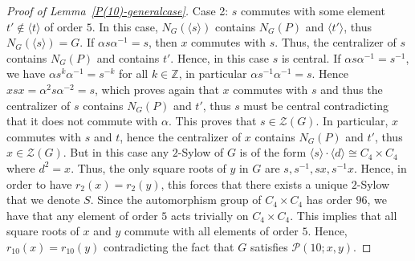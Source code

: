 \documentclass[12pt]{amsart}
\numberwithin{equation}{section}
\newcommand{\Z}{\mathbb Z}
\theoremstyle{definition}
\theoremstyle{remark}
\begin{document}
\begin{proof}[Proof of Lemma~\ref{P(10)-generalcase}]
    Case 2: $s$ commutes with some element $t'\notin \langle t\rangle$ of order $5$. In this case, $N_G(\langle s\rangle)$ contains $N_G(P)$ and $\langle t'\rangle$, thus $N_G(\langle s\rangle)=G$. If $\alpha s\alpha ^{-1}=s$, then $x$ commutes with $s$. Thus, the centralizer of $s$ contains $N_G(P)$ and contains $t'$. Hence, in this case $s$ is central. If $\alpha s\alpha^{-1}=s^{-1}$, we have $\alpha s^k \alpha^{-1}=s^{-k}$ for all $k\in \Z$, in particular $\alpha s^{-1}\alpha^{-1}=s$. Hence $x sx=\alpha^2 s\alpha^{-2}=s$, which proves again that $x$ commutes with $s$ and thus the centralizer of $s$ contains $N_G(P)$ and $t'$, thus $s$ must be central contradicting that it does not commute with $\alpha$. This proves that $s\in \mathcal{Z}(G)$. In particular, $x$ commutes with $s$ and $t$, hence the centralizer of $x$ contains $N_G(P)$ and $t'$, thus $x\in \mathcal{Z}(G)$. But in this case any $2$-Sylow of $G$ is of the form $\langle s\rangle \cdot \langle d\rangle\cong C_4\times C_4$ where $d^2=x$. Thus, the only square roots of $y$ in $G$ are $s,s^{-1},sx, s^{-1}x$. Hence, in order to have $r_2(x)=r_2(y)$, this forces that there exists a unique $2$-Sylow that we denote $S$. Since the automorphism group of $C_4\times C_4$ has order $96$, we have that any element of order $5$ acts trivially on $C_4\times C_4$. This implies that all square roots of $x$ and $y$ commute with all elements of order $5$. Hence, $r_{10}(x)=r_{10}(y)$ contradicting the fact that $G$ satisfies $\mathcal{P}(10;x,y)$. \end{proof}
\end{document}
